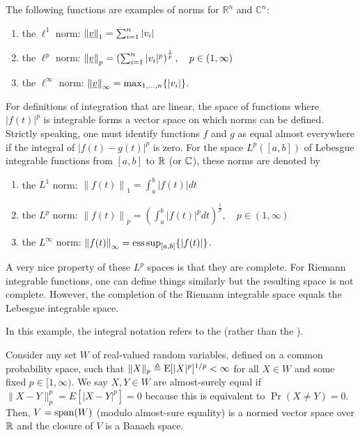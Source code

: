 \begin{example}
The following functions are examples of norms for $\mathbb{R}^n$ and $\mathbb{C}^n$:
\begin{enumerate}
\item the $\ell^1$ norm: $\left\| \underline{v} \right\|_1 = \sum_{i=1}^n |v_i|$
\item the $\ell^p$ norm: $\left\| \underline{v} \right\|_p = \left( \sum_{i=1}^n |v_i|^p \right)^{\frac{1}{p}}, \quad p \in (1,\infty)$
\item the $\ell^{\infty}$ norm: $\left\| \underline{v} \right\|_{\infty} = \max_{1,\ldots, n} \{ |v_i| \}$.
\end{enumerate}
\end{example}

\begin{example}
For definitions of integration that are linear, the space of functions where $|f(t)|^p$ is integrable forms a vector space on which norms can be defined.
Strictly speaking, one must identify functions $f$ and $g$ as equal almost everywhere if the integral of $|f(t)-g(t)|^p$ is zero.
For the space $L^p ([a,b])$ of Lebesgue integrable functions from $[a, b]$ to $\mathbb{R}$ (or $\mathbb{C}$), these norms are denoted by
\begin{enumerate}
\item the $L^1$ norm: $\left\| f(t) \right\|_1 = \int_a^b |f(t)| dt$
\item the $L^p$ norm: $\left\| f(t) \right\|_p = \left( \int_a^b |f(t)|^p dt \right)^{\frac{1}{p}}, \quad p \in (1,\infty)$
\item the $L^{\infty}$ norm: $\left\| f(t) \right\|_{\infty} = \operatorname*{ess\,sup}_{[a,b]} \{ | f(t) | \}$.
\end{enumerate}
A very nice property of these $L^p$ spaces is that they are complete.
For Riemann integrable functions, one can define things similarly but the resulting space is not complete.
However, the completion of the Riemann integrable space equals the Lebesgue integrable space.
\end{example}

In this example, the integral notation refers to the  (rather than the ).


\begin{example}
Consider any set $W$ of real-valued random variables, defined on a common probability space, such that $\| X \|_p \triangleq \mathrm{E} [|X|^p]^{1/p} < \infty$ for all $X\in W$ and some fixed $p\in [1,\infty)$.
We say $X,Y\in W$ are almost-surely equal if $\| X-Y \|_p^p = E \left[ |X-Y|^p \right] = 0$ because this is equivalent to $\Pr (X \neq Y ) = 0$.
Then, $V = \mathrm{span} (W)$ (modulo almost-sure equality) is a normed vector space over $\mathbb{R}$ and the closure of $V$ is a Banach space.
\end{example}

